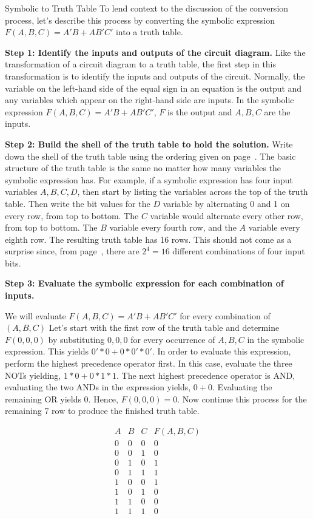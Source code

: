 \begin{process}{Symbolic to Truth Table}
\label{process:representationSymToTT}
To lend context to the discussion of the conversion process, let's describe this
process by converting the symbolic expression
$F(A,B,C) = A'B + AB'C'$ into a truth table.


\textbf{Step 1:  Identify the inputs and outputs of the circuit diagram.}
Like the transformation of a circuit diagram to a truth table, the
first step in this transformation is to identify the inputs and outputs 
of the circuit.  Normally, the variable on the left-hand side
of the equal sign in an equation is the output and any variables 
which appear on the right-hand side are inputs.  In the symbolic expression
$F(A,B,C) = A'B + AB'C'$, $F$ is the output and $A,B,C$ are the inputs.

\textbf{Step 2:  Build the shell of the truth table to hold the solution.}
Write down the shell of the truth table using the
ordering given on page~\pageref{page:TTshell}.  The basic structure of the
truth table is the same no matter how many variables the symbolic 
expression has.  
For example, if a symbolic expression has four input variables $A,B,C,D$,
then start by listing the variables across the top of the truth table.  
Then write the bit values for the $D$ variable by alternating 0
and 1 on every row, from top to bottom. The $C$ variable would alternate 
every other row, from top to bottom.  The $B$ variable every
fourth row, and the $A$ variable every eighth row.  The resulting 
truth table has 16 rows.  This should not come as a surprise since,
from page~\pageref{page:two-to-N}, there are 
$2^4=16$ different combinations of four input bits.

\textbf{Step 3: Evaluate the symbolic expression for each combination of inputs.}
 
We will evaluate $F(A,B,C) = A'B + AB'C'$ for every combination of $(A,B,C)$  Let's
start with the first row of the truth table and determine $F(0,0,0)$ by
substituting $0,0,0$ for every occurrence of $A,B,C$ in the symbolic 
expression.  This yields $0'*0+0*0'*0'$.  In order to evaluate this expression, 
perform the highest precedence operator first.  In this case, evaluate 
the three NOTs yielding, $1*0+0*1*1$.  The next highest 
precedence operator is AND, evaluating the two ANDs in the expression 
yields, $0+0$.   Evaluating the remaining OR yields 0.  Hence, $F(0,0,0)=0$.
Now continue this process for the remaining 7 row to produce the finished
truth table.

$$\begin{array}{c|c|c||c}
A & B & C & F(A,B,C) \\ \hline \hline
0 & 0 & 0 &  0  \\ \hline
0 & 0 & 1 &  0  \\ \hline
0 & 1 & 0 &  1  \\ \hline
0 & 1 & 1 &  1  \\ \hline
1 & 0 & 0 &  1  \\ \hline
1 & 0 & 1 &  0  \\ \hline
1 & 1 & 0 &  0  \\ \hline
1 & 1 & 1 &  0 
\end{array} $$
\end{process}


